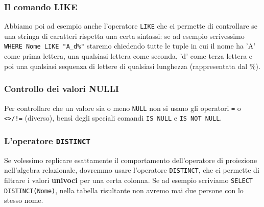 \documentclass[12pt]{report}
\begin{document}
	\subsubsection*{Il comando LIKE}
	Abbiamo poi ad esempio anche l'operatore \texttt{LIKE} che ci permette di controllare se una stringa di caratteri rispetta una certa sintassi: se ad esempio scrivessimo \texttt{WHERE Nome LIKE "A\_d\%"} staremo chiedendo tutte le tuple in cui il nome ha 'A' come prima lettera, una qualsiasi lettera come seconda, 'd' come terza lettera e poi una qualsiasi sequenza di lettere di qualsiasi lunghezza (rappresentata dal \%).
	
	\subsubsection*{Controllo dei valori NULLI}
	Per controllare che un valore sia o meno \texttt{NULL} non si usano gli operatori \texttt{=} o \texttt{<>/!=} (diverso), bensì degli speciali comandi \texttt{IS NULL} e \texttt{IS NOT NULL}.
	
	\subsubsection*{L'operatore \texttt{DISTINCT}}
	Se volessimo replicare esattamente il comportamento dell'operatore di proiezione nell'algebra relazionale, dovremmo usare l'operatore \texttt{DISTINCT}, che ci permette di filtrare i valori \textbf{univoci} per una certa colonna. Se ad esempio scriviamo \texttt{SELECT DISTINCT(Nome)}, nella tabella risultante non avremo mai due persone con lo stesso nome.
	
\end{document}

